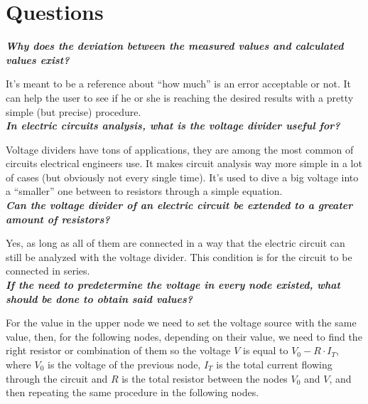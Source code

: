 \documentclass[letterpaper]{article}
\begin{document}
\section{Questions}
\textit{\textbf{Why does the deviation between the measured values and calculated values exist?}}

It’s meant to be a reference about “how much” is an error acceptable or not. It can help the user
to see if he or she is reaching the desired results with a pretty simple (but precise)
procedure.\\
\textit{\textbf{In electric circuits analysis, what is the voltage divider useful for?}}

Voltage dividers have tons of applications, they are among the most common of circuits electrical
engineers use. It makes circuit analysis way more simple in a lot of cases (but obviously not
every single time). It’s used to dive a big voltage into a “smaller” one between to resistors
through a simple equation.\\
\textit{\textbf{Can the voltage divider of an electric circuit be extended to a greater amount of
resistors?}}

Yes, as long as all of them are connected in a way  that the electric circuit can still be
analyzed with the voltage divider. This condition is for the circuit to be connected in
series.\\
\textit{\textbf{If the need to predetermine the voltage in every node existed, what should be done to
obtain said values?}}

For the value in the upper node we need to set the voltage source with the
same value, then, for the following nodes, depending on their value, we need to find the
right resistor or combination of them so the voltage $V$ is equal to $V_0-R\cdot I_T$, where
$V_0$ is the voltage of the previous node, $I_T$ is the total current flowing
through the circuit and $R$ is the total resistor between the nodes $V_0$ and $V$, and then
repeating the same procedure in the following nodes.
\end{document}
